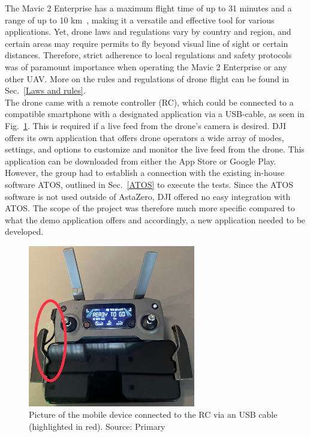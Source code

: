 The Mavic 2 Enterprise has a maximum flight time of up to 31 minutes and a range of up to 10 km~\cite{DJI2018MavicDJI}, making it a versatile and effective tool for various applications. Yet, drone laws and regulations vary by country and region, and certain areas may require permits to fly beyond visual line of sight or certain distances. Therefore, strict adherence to local regulations and safety protocols was of paramount importance when operating the Mavic 2 Enterprise or any other UAV. More on the rules and regulations of drone flight can be found in Sec.~\ref{Laws and rules}.
\newline 
\\

The drone came with a remote controller (RC), which could be connected to a compatible smartphone with a designated application via a USB-cable, as seen in Fig.~\ref{RC w phone}. This is required if a live feed from the drone's camera is desired. DJI offers its own application that offers drone operators a wide array of modes, settings, and options to customize and monitor the live feed from the drone. This application can be downloaded from either the App Store or Google Play. However, the group had to establish a connection with the existing in-house software ATOS, outlined in Sec.~\ref{ATOS} to execute the tests. Since the ATOS software is not used outside of AstaZero, DJI offered no easy integration with ATOS. The scope of the project was therefore much more specific compared to what the demo application offers and accordingly, a new application needed to be developed.

\begin{figure}[!h]
\centering
 \includegraphics[width=0.65\textwidth,angle =0]{figure/345858277_6148140848602054_316699155434135194_n.jpg}
\caption{Picture of the mobile device connected to the RC via an USB cable (highlighted in red). Source: Primary}
\label{RC w phone}
\end{figure}



